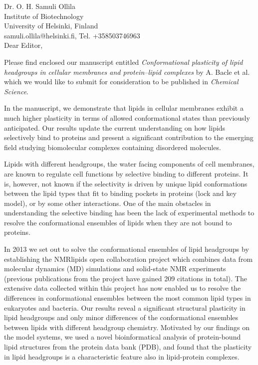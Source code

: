 \documentclass[11pt]{letter}
\begin{document}
\reversemarginpar
\pagestyle{empty}
\noindent Dr. O. H. Samuli Ollila \\
\noindent Institute of Biotechnology \\
\noindent University of Helsinki, Finland \\
\noindent samuli.ollila@helsinki.fi, Tel. +358503746963 \\


Dear Editor,

Please find enclosed our manuscript entitled {\it Conformational plasticity of lipid headgroups in cellular membranes and protein--lipid complexes}
by A. Bacle et al. which we would like to submit for consideration to be published in \textit{Chemical Science}.

In the manuscript, we demonstrate that lipids in cellular membranes exhibit a much higher plasticity in terms of allowed conformational states than previously anticipated.
Our results update the current understanding on how lipids selectively bind to proteins
and present a significant contribution to the emerging field studying biomolecular complexes containing disordered molecules.

Lipids with different headgroups, the water facing components of cell membranes, are known to regulate cell functions
by selective binding to different proteins. It is, however, not known if the selectivity is driven by unique
lipid conformations between the lipid types that fit to binding pockets in proteins (lock and key model), or by some other interactions.
One of the main obstacles in understanding the selective binding has been the lack of
experimental methods to resolve the conformational ensembles of lipids when they are not bound to proteins.

In 2013 we set out to solve the conformational ensembles of lipid headgroups by establishing the NMRlipids open collaboration project
which combines data from molecular dynamics (MD) simulations and solid-state NMR experiments (previous publications from the project have gained 209 citations in total).
The extensive data collected within this project has now enabled us to resolve the differences in conformational ensembles between the most common lipid types in eukaryotes and bacteria. 
Our results reveal a significant structural plasticity in lipid headgroups and only minor differences of the conformational ensembles
between lipids with different headgroup chemistry.
Motivated by our findings on the model systems, we used a novel bioinformatical analysis of protein-bound lipid structures from the protein data bank (PDB), and found that the plasticity in lipid headgroups is a characteristic feature also in lipid-protein complexes.
\end{document}
